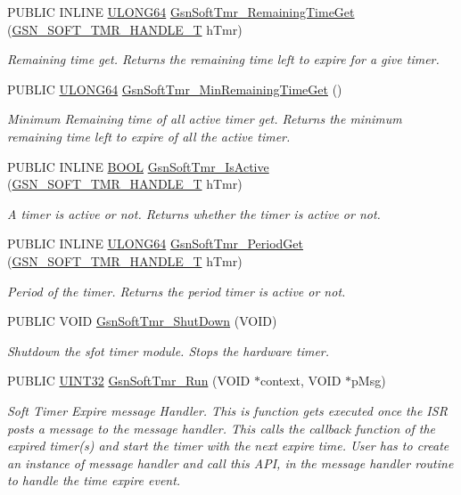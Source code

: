 \begin{DoxyCompactItemize}
PUBLIC INLINE \hyperlink{a00660_ga28961430434ccabca6862ea93fe9a15b}{ULONG64} \hyperlink{a00673_gaa4dc761b52f892e3c5190db7d1bc8eac}{GsnSoftTmr\_\-RemainingTimeGet} (\hyperlink{a00229}{GSN\_\-SOFT\_\-TMR\_\-HANDLE\_\-T} hTmr)
\begin{DoxyCompactList}\small\item\em Remaining time get. Returns the remaining time left to expire for a give timer. \end{DoxyCompactList}\item 
PUBLIC \hyperlink{a00660_ga28961430434ccabca6862ea93fe9a15b}{ULONG64} \hyperlink{a00673_gac722c11a548ed0b5994c9adbc753c28a}{GsnSoftTmr\_\-MinRemainingTimeGet} ()
\begin{DoxyCompactList}\small\item\em Minimum Remaining time of all active timer get. Returns the minimum remaining time left to expire of all the active timer. \end{DoxyCompactList}\item 
PUBLIC INLINE \hyperlink{a00660_ga1f04022c0a182c51c059438790ea138c}{BOOL} \hyperlink{a00673_ga784a1e62206ba30a4f7141e67cdd94ae}{GsnSoftTmr\_\-IsActive} (\hyperlink{a00229}{GSN\_\-SOFT\_\-TMR\_\-HANDLE\_\-T} hTmr)
\begin{DoxyCompactList}\small\item\em A timer is active or not. Returns whether the timer is active or not. \end{DoxyCompactList}\item 
PUBLIC INLINE \hyperlink{a00660_ga28961430434ccabca6862ea93fe9a15b}{ULONG64} \hyperlink{a00673_ga12c97d9f8952a41772dd116afd1cd801}{GsnSoftTmr\_\-PeriodGet} (\hyperlink{a00229}{GSN\_\-SOFT\_\-TMR\_\-HANDLE\_\-T} hTmr)
\begin{DoxyCompactList}\small\item\em Period of the timer. Returns the period timer is active or not. \end{DoxyCompactList}\item 
PUBLIC VOID \hyperlink{a00673_ga9e0fc424d9ba323bca2e72480969fe45}{GsnSoftTmr\_\-ShutDown} (VOID)
\begin{DoxyCompactList}\small\item\em Shutdown the sfot timer module. Stops the hardware timer. \end{DoxyCompactList}\item 
PUBLIC \hyperlink{a00660_gae1e6edbbc26d6fbc71a90190d0266018}{UINT32} \hyperlink{a00673_ga14b04d16861c3ae86cbd69b254e60873}{GsnSoftTmr\_\-Run} (VOID $\ast$context, VOID $\ast$pMsg)
\begin{DoxyCompactList}\small\item\em Soft Timer Expire message Handler. This is function gets executed once the ISR posts a message to the message handler. This calls the callback function of the expired timer(s) and start the timer with the next expire time. User has to create an instance of message handler and call this API, in the message handler routine to handle the time expire event. \end{DoxyCompactList}\end{DoxyCompactItemize}
